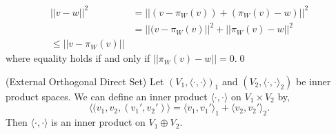 \documentclass{article}
\begin{document}
\pf \begin{align*}
	||v-w||^2&=||(v-\pi_W(v))+(\pi_W(v)-w)||^2\\
		 &=||(v-\pi_W(v)||^2+||\pi_W(v)-w||^2\\
		 \le ||v-\pi_W(v)||
\end{align*}
where equality holds if and only if $ ||\pi_W(v)-w||=0 $.\qed
\begin{definition}
	(External Orthogonal Direct Set) Let $ (V_1,\langle \cdot,\cdot\rangle)_1 $ and $ (V_2,\langle\cdot,\cdot\rangle_2) $ be inner product spaces. We can define an inner product $ \langle\cdot,\cdot\rangle $ on $ V_1\times V_2 $ by,
	\[
	  \langle(v_1,v_2,(v_1',v_2')\rangle=\langle v_1,v_1'\rangle_1+\langle v_2,v_2'\rangle_2.
	\]
	Then $ \langle \cdot,\cdot\rangle $ is an inner product on $ V_1\oplus V_2 $.
\end{definition}
\end{document}
